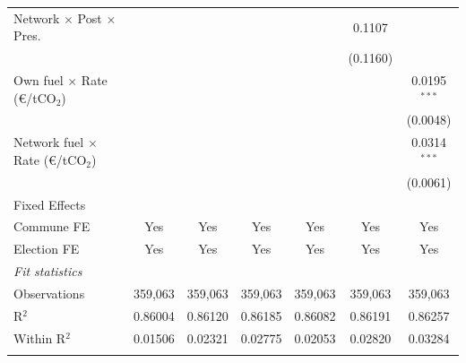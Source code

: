 \begin{table}[htbp]
\begin{tabular}{lcccccc}
      Network $\times$ Post $\times$ Pres.         &               &               &                &                & 0.1107          &   \\   
                                                   &               &               &                &                & (0.1160)        &   \\   
      Own fuel $\times$ Rate (\euro/tCO$_2$)       &               &               &                &                &                 & 0.0195$^{***}$\\   
                                                   &               &               &                &                &                 & (0.0048)\\   
      Network fuel $\times$ Rate (\euro/tCO$_2$)   &               &               &                &                &                 & 0.0314$^{***}$\\   
                                                   &               &               &                &                &                 & (0.0061)\\   
      \midrule Fixed Effects\\
      Commune FE                                   & Yes           & Yes           & Yes            & Yes            & Yes             & Yes\\  
      Election FE                                  & Yes           & Yes           & Yes            & Yes            & Yes             & Yes\\  
      \midrule
      \emph{Fit statistics}\\
      Observations                                 & 359,063       & 359,063       & 359,063        & 359,063        & 359,063         & 359,063\\  
      R$^2$                                        & 0.86004       & 0.86120       & 0.86185        & 0.86082        & 0.86191         & 0.86257\\  
      Within R$^2$                                 & 0.01506       & 0.02321       & 0.02775        & 0.02053        & 0.02820         & 0.03284\\  
      \midrule \midrule & \tabularnewline
   \end{tabular}
\end{table}
